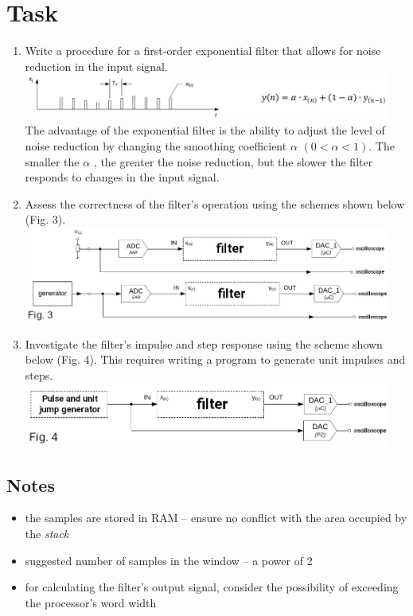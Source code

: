 \documentclass{article}
\begin{document}
\section*{Task}
\begin{enumerate}[label=\Alph*.]
    \item Write a procedure for a first-order exponential filter that allows for noise reduction in the input signal. \\
    \includegraphics[width=0.95\textwidth]{../img/filter_2a.png} \\
    The advantage of the exponential filter is the ability to adjust the level of noise reduction by changing the smoothing coefficient $\alpha$ $(0 < \alpha < 1)$. The smaller the $\alpha$ , the greater the noise reduction, but the slower the filter responds to changes in the input signal.
    
    \item Assess the correctness of the filter's operation using the schemes shown below (Fig. 3). \\
    \includegraphics[width=0.95\textwidth]{../img/filter_2b.png}

    \item Investigate the filter's impulse and step response using the scheme shown below (Fig. 4). This requires writing a program to generate unit impulses and steps. \\
    \includegraphics[width=0.95\textwidth]{../img/filter_c.png}
\end{enumerate}

\subsection*{Notes}
\begin{itemize}
    \item the samples are stored in RAM – ensure no conflict with the area occupied by the \textit{stack}
    \item suggested number of samples in the window – a power of 2
    \item for calculating the filter’s output signal, consider the possibility of exceeding the processor's word width
\end{itemize}
\end{document}

